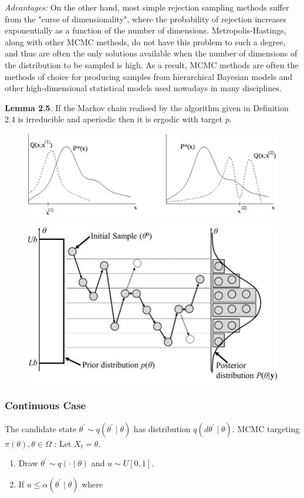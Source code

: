 \documentclass{article}
\begin{document}
\textit{Advantages:}
On the other hand, most simple rejection sampling methods suffer from the "curse of dimensionality", where the probability of rejection increases exponentially as a function of the number of dimensions. Metropolis-Hastings, along with other MCMC methods, do not have this problem to such a degree, and thus are often the only solutions available when the number of dimensions of the distribution to be sampled is high. As a result, MCMC methods are often the methods of choice for producing samples from hierarchical Bayesian models and other high-dimensional statistical models used nowadays in many disciplines.


\textbf{Lemma 2.5}. If the Markov chain realised by the algorithm given in Definition 2.4 is irreducible and aperiodic then it is ergodic with target $p$.

\begin{figure}
    \centering
    \includegraphics[width=1\linewidth]{ox-hilary/bayes-methods/figures/450px-Metropolis_hastings_algorithm.png}
\end{figure}
\begin{figure}
    \centering
    \includegraphics[width=0.5\linewidth]{ox-hilary/bayes-methods/figures/flow.png}
\end{figure}
\subsubsection{Continuous Case}

The candidate state $\theta^{\prime} \sim q\left(\theta^{\prime} \mid \theta\right)$ has distribution $q\left(d \theta^{\prime} \mid \theta\right)$. MCMC targeting $\pi(\theta), \theta \in \Omega$ : Let $X_t=\theta$.
\begin{enumerate}
    \item Draw $\theta^{\prime} \sim q(\cdot \mid \theta)$ and $u \sim U[0,1]$.
    \item  If $u \leq \alpha\left(\theta^{\prime} \mid \theta\right)$ where
\end{enumerate}
 
\end{document}
